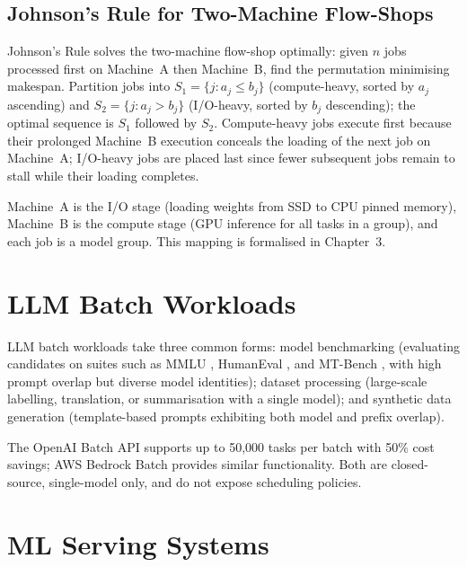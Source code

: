 \documentclass[logo,bsc,singlespacing,parskip,online]{infthesis}
\begin{document}
\subsection{Johnson's Rule for Two-Machine Flow-Shops}
\label{sec:bg_johnsons_rule}

Johnson's Rule \citep{pinedo2016scheduling} solves the two-machine flow-shop optimally: given $n$ jobs processed first on Machine~A then Machine~B, find the permutation minimising makespan. Partition jobs into $S_1 = \{j : a_j \leq b_j\}$ (compute-heavy, sorted by $a_j$ ascending) and $S_2 = \{j : a_j > b_j\}$ (I/O-heavy, sorted by $b_j$ descending); the optimal sequence is $S_1$ followed by $S_2$. Compute-heavy jobs execute first because their prolonged Machine~B execution conceals the loading of the next job on Machine~A; I/O-heavy jobs are placed last since fewer subsequent jobs remain to stall while their loading completes.

Machine~A is the I/O stage (loading weights from SSD to CPU pinned memory), Machine~B is the compute stage (GPU inference for all tasks in a group), and each job is a model group. This mapping is formalised in Chapter~3.



\section{LLM Batch Workloads}

LLM batch workloads take three common forms: model benchmarking (evaluating candidates on suites such as MMLU \citep{hendrycks2020measuring}, HumanEval \citep{chen2021evaluating}, and MT-Bench \citep{zheng2023judging}, with high prompt overlap but diverse model identities); dataset processing (large-scale labelling, translation, or summarisation with a single model); and synthetic data generation (template-based prompts exhibiting both model and prefix overlap).

The OpenAI Batch API \citep{openai_batch_api} supports up to 50,000 tasks per batch with 50\% cost savings; AWS Bedrock Batch \citep{aws_bedrock_batch} provides similar functionality. Both are closed-source, single-model only, and do not expose scheduling policies.

\section{ML Serving Systems}
\end{document}
